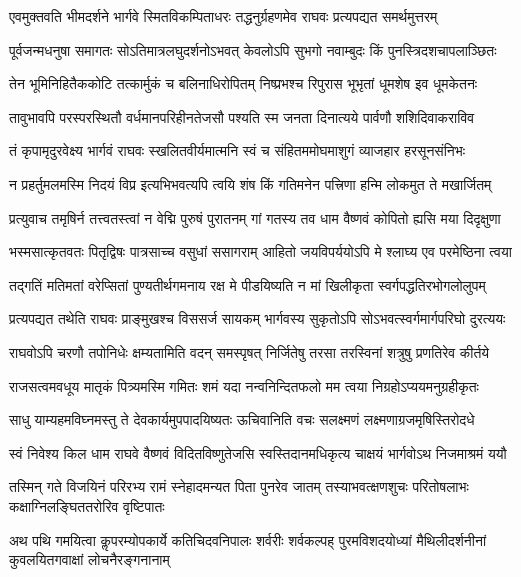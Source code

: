 \twolineshloka
{एवमुक्तवति भीमदर्शने भार्गवे स्मितविकम्पिताधरः}
{तद्धनुर्ग्रहणमेव राघवः प्रत्यपद्यत समर्थमुत्तरम्}%

\twolineshloka
{पूर्वजन्मधनुषा समागतः सोऽतिमात्रलघुदर्शनोऽभवत्}
{केवलोऽपि सुभगो नवाम्बुदः किं पुनस्त्रिदशचापलाञ्छितः}%

\twolineshloka
{तेन भूमिनिहितैककोटि तत्कार्मुकं च बलिनाधिरोपितम्}
{निष्प्रभश्च रिपुरास भूभृतां धूमशेष इव धूमकेतनः}%

\twolineshloka
{तावुभावपि परस्परस्थितौ वर्धमानपरिहीनतेजसौ}
{पश्यति स्म जनता दिनात्यये पार्वणौ शशिदिवाकराविव}%

\twolineshloka
{तं कृपामृदुरवेक्ष्य भार्गवं राघवः स्खलितवीर्यमात्मनि}
{स्वं च संहितममोघमाशुगं व्याजहार हरसूनसंनिभः}%

\twolineshloka
{न प्रहर्तुमलमस्मि निदयं विप्र इत्यभिभवत्यपि त्वयि}
{शंष किं गतिमनेन पत्त्रिणा हन्मि लोकमुत ते मखार्जितम्}%

\twolineshloka
{प्रत्युवाच तमृषिर्न तत्त्वतस्त्वां न वेद्मि पुरुषं पुरातनम्}
{गां गतस्य तव धाम वैष्णवं कोपितो ह्यसि मया दिदृक्षुणा}%

\twolineshloka
{भस्मसात्कृतवतः पितृद्विषः पात्रसाच्च वसुधां ससागराम्}
{आहितो जयविपर्ययोऽपि मे श्लाघ्य एव परमेष्ठिना त्वया}%

\twolineshloka
{तद्गतिं मतिमतां वरेप्सितां पुण्यतीर्थगमनाय रक्ष मे}
{पीडयिष्यति न मां खिलीकृता स्वर्गपद्धतिरभोगलोलुपम्}%

\twolineshloka
{प्रत्यपद्यत तथेति राघवः प्राङ्मुखश्च विससर्ज सायकम्}
{भार्गवस्य सुकृतोऽपि सोऽभवत्स्वर्गमार्गपरिघो दुरत्ययः}%

\twolineshloka
{राघवोऽपि चरणौ तपोनिधेः क्षम्यतामिति वदन् समस्पृषत्}
{निर्जितेषु तरसा तरस्विनां शत्रुषु प्रणतिरेव कीर्तये}%

\twolineshloka
{राजसत्वमवधूय मातृकं पित्र्यमस्मि गमितः शमं यदा}
{नन्वनिन्दितफलो मम त्वया निग्रहोऽप्ययमनुग्रहीकृतः}%

\twolineshloka
{साधु याम्यहमविघ्नमस्तु ते देवकार्यमुपपादयिष्यतः}
{ऊचिवानिति वचः सलक्ष्मणं लक्ष्मणाग्रजमृषिस्तिरोदधे}%

\twolineshloka
{स्वं निवेश्य किल धाम राघवे वैष्णवं विदितविष्णुतेजसि}
{स्वस्तिदानमधिकृत्य चाक्षयं भार्गवोऽथ निजमाश्रमं ययौ}%

\twolineshloka
{तस्मिन् गते विजयिनं परिरभ्य रामं स्नेहादमन्यत पिता पुनरेव जातम्}
{तस्याभवत्क्षणशुचः परितोषलाभः कक्षाग्निलङ्घिततरोरिव वृष्टिपातः}%

\twolineshloka
{अथ पथि गमयित्वा कॢपरम्योपकार्ये कतिचिदवनिपालः शर्वरीः शर्वकल्पह्}
{पुरमविशदयोध्यां मैथिलीदर्शनीनां कुवलयितगवाक्षां लोचनैरङ्गनानाम्}%


